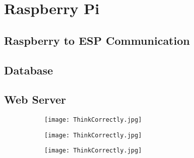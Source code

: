 \chapter{Raspberry Pi}
    \section{Raspberry to ESP Communication}
    \section{Database}
    \section{Web Server}

    \begin{figure}[h]
        \centering
        \begin{subfigure}{.4\textwidth} %
            \centering
            \texttt{[image: ThinkCorrectly.jpg]} \\
            \caption{}
        \end{subfigure}
    
        \begin{subfigure}{.4\textwidth} %
            \centering
            \texttt{[image: ThinkCorrectly.jpg]} \\
            \caption{}
        \end{subfigure}
        \hfill%
        \begin{subfigure}{.4\textwidth} %
            \centering
            \texttt{[image: ThinkCorrectly.jpg]} \\
            \caption{}
            \label{fig:sub3}
        \end{subfigure}
    \end{figure}
